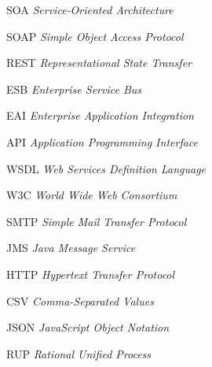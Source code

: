 \begin{siglas}
  \item[SOA] \textit{Service-Oriented Architecture}
  \item[SOAP] \textit{Simple Object Access Protocol}
  \item[REST] \textit{Representational State Transfer}
  \item[ESB] \textit{Enterprise Service Bus}
  \item[EAI] \textit{Enterprise Application Integration}
  \item[API] \textit{Application Programming Interface}
  \item[WSDL] \textit{Web Services Definition Language}
  \item[W3C] \textit{World Wide Web Consortium}
  \item[SMTP] \textit{Simple Mail Transfer Protocol}
  \item[JMS] \textit{Java Message Service}
  \item[HTTP] \textit{Hypertext Transfer Protocol}
  \item[CSV] \textit{Comma-Separated Values}
  \item[JSON] \textit{JavaScript Object Notation }
  \item[RUP] \textit{Rational Unified Process}
\end{siglas}
